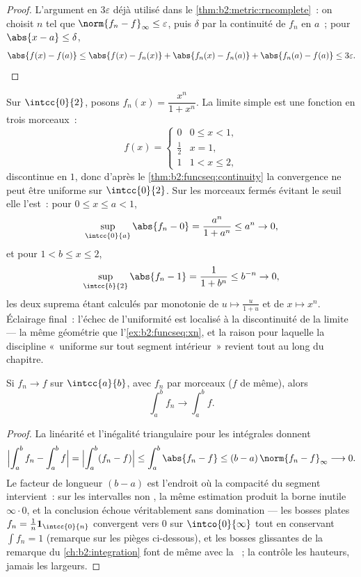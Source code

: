\begin{proof}
L'argument en $3\varepsilon$ déjà utilisé dans le
\cref{thm:b2:metric:rncomplete}~: on choisit $n$ tel que $\norm{f_n -
f}_\infty \leq \varepsilon$, puis $\delta$ par la continuité de
$f_n$ en $a$~; pour $\abs{x - a} \leq \delta$,
\[
\abs{f(x) - f(a)} \leq \abs{f(x) - f_n(x)} + \abs{f_n(x) - f_n(a)}
+ \abs{f_n(a) - f(a)} \leq 3\varepsilon . \qedhere
\]
\end{proof}

\begin{example}\label{ex:b2:funcseq:threshold}
Sur $\intcc{0}{2}$, posons $f_n(x) = \dfrac{x^n}{1 + x^n}$. La
limite simple est une fonction en trois morceaux~:
\[
f(x) = \begin{cases} 0 & 0 \leq x < 1,\\[2pt]
\tfrac12 & x = 1,\\[2pt]
1 & 1 < x \leq 2, \end{cases}
\]
discontinue en $1$, donc d'après le \cref{thm:b2:funcseq:continuity}
la convergence ne peut être uniforme sur $\intcc{0}{2}$. Sur les
morceaux fermés évitant le seuil elle l'est~: pour $0 \leq x \leq
a < 1$,
\[
\sup_{\intcc{0}{a}}\abs{f_n - 0}
= \frac{a^n}{1 + a^n} \leq a^n \to 0 ,
\]
et pour $1 < b \leq x \leq 2$,
\[
\sup_{\intcc{b}{2}}\abs{f_n - 1}
= \frac{1}{1 + b^n} \leq b^{-n} \to 0 ,
\]
les deux suprema étant calculés par monotonie de $u \mapsto
\frac{u}{1+u}$ et de $x \mapsto x^n$. Éclairage final~: l'échec de
l'uniformité est localisé à la discontinuité de la limite --- la même
géométrie que l'\cref{ex:b2:funcseq:xn}, et la raison pour laquelle la
discipline «~uniforme sur tout segment intérieur~» revient tout au
long du chapitre.
\end{example}

\begin{theorem}\label{thm:b2:funcseq:integration}
Si $f_n \to f$  sur $\intcc{a}{b}$, avec $f_n$ 
par morceaux ($f$ de même), alors
\[
\int_a^b f_n \longrightarrow \int_a^b f .
\]
\end{theorem}

\begin{proof}
La linéarité et l'inégalité triangulaire pour les intégrales donnent
\[
\Bigl|\int_a^b f_n - \int_a^b f\Bigr|
= \Bigl|\int_a^b (f_n - f)\Bigr|
\leq \int_a^b\abs{f_n - f}
\leq (b - a)\,\norm{f_n - f}_\infty \longrightarrow 0 .
\]
Le facteur de longueur $(b - a)$ est l'endroit où la compacité du
segment intervient~: sur les intervalles non , la même
estimation produit la borne inutile $\infty\cdot0$, et la conclusion
échoue véritablement sans domination --- les bosses plates $f_n =
\frac1n\mathbf 1_{\intcc{0}{n}}$ convergent  vers $0$ sur
$\intco{0}{\infty}$ tout en conservant $\int f_n = 1$ (remarque sur
les pièges ci-dessous), et les bosses glissantes de la remarque du
\cref{ch:b2:integration} font de même avec la ~; la
 contrôle les hauteurs, jamais les largeurs.
\end{proof}

